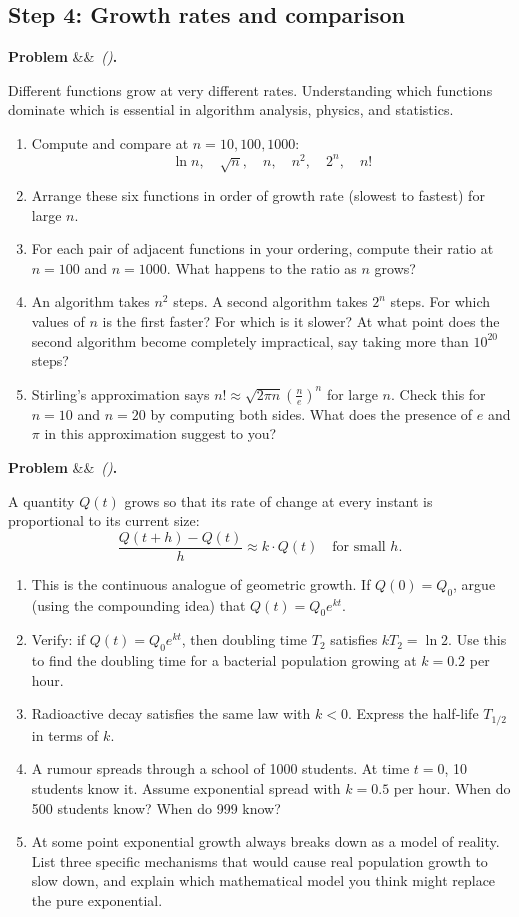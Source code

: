 \documentclass[12pt, a4paper]{article}
\newcounter{problem}
\newenvironment{problem}[1][]{%
  \refstepcounter{problem}%
  \par\vspace{6pt}%
  \noindent\textbf{\color{MidBlue}Problem \theproblem}%
  \ifx&#1&\else\ \textit{(#1)}\fi\textbf{.}\enskip
}{\par\vspace{4pt}}
\begin{document}
\subsection{Step 4: Growth rates and comparison}

\begin{problem}
\label{prob:growth_compare}
Different functions grow at very different rates. Understanding which functions dominate which is essential in algorithm analysis, physics, and statistics.
\begin{enumerate}[label=(\alph*), topsep=2pt]
  \item Compute and compare at $n = 10, 100, 1000$:
  \[
    \ln n, \quad \sqrt{n}, \quad n, \quad n^2, \quad 2^n, \quad n!
  \]
  \item Arrange these six functions in order of growth rate (slowest to fastest) for large $n$.
  \item For each pair of adjacent functions in your ordering, compute their ratio at $n = 100$ and $n = 1000$. What happens to the ratio as $n$ grows?
  \item An algorithm takes $n^2$ steps. A second algorithm takes $2^n$ steps. For which values of $n$ is the first faster? For which is it slower? At what point does the second algorithm become completely impractical, say taking more than $10^{20}$ steps?
  \item Stirling's approximation says $n! \approx \sqrt{2\pi n}\left(\frac{n}{e}\right)^n$ for large $n$. Check this for $n = 10$ and $n = 20$ by computing both sides. What does the presence of $e$ and $\pi$ in this approximation suggest to you?
\end{enumerate}
\end{problem}

\begin{problem}
\label{prob:natural_growth}
A quantity $Q(t)$ grows so that its rate of change at every instant is proportional to its current size:
\[
  \frac{Q(t+h) - Q(t)}{h} \approx k \cdot Q(t) \quad \text{for small } h.
\]
\begin{enumerate}[label=(\alph*), topsep=2pt]
  \item This is the continuous analogue of geometric growth. If $Q(0) = Q_0$, argue (using the compounding idea) that $Q(t) = Q_0 e^{kt}$.
  \item Verify: if $Q(t) = Q_0 e^{kt}$, then doubling time $T_2$ satisfies $kT_2 = \ln 2$. Use this to find the doubling time for a bacterial population growing at $k = 0.2$ per hour.
  \item Radioactive decay satisfies the same law with $k < 0$. Express the half-life $T_{1/2}$ in terms of $k$.
  \item A rumour spreads through a school of 1000 students. At time $t = 0$, 10 students know it. Assume exponential spread with $k = 0.5$ per hour. When do 500 students know? When do 999 know?
  \item At some point exponential growth always breaks down as a model of reality. List three specific mechanisms that would cause real population growth to slow down, and explain which mathematical model you think might replace the pure exponential.
\end{enumerate}
\end{problem}
\end{document}
